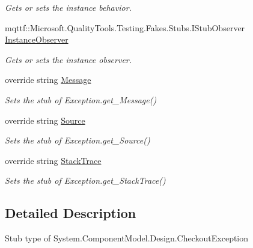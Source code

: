 \begin{DoxyCompactItemize}
\begin{DoxyCompactList}\small\item\em Gets or sets the instance behavior.\end{DoxyCompactList}\item 
mqttf\-::\-Microsoft.\-Quality\-Tools.\-Testing.\-Fakes.\-Stubs.\-I\-Stub\-Observer \hyperlink{class_system_1_1_component_model_1_1_design_1_1_fakes_1_1_stub_checkout_exception_a59dbec0d5ecebd2e2d3aca503fecbb8b}{Instance\-Observer}
\begin{DoxyCompactList}\small\item\em Gets or sets the instance observer.\end{DoxyCompactList}\item 
override string \hyperlink{class_system_1_1_component_model_1_1_design_1_1_fakes_1_1_stub_checkout_exception_a6f706b5e3a5874ca4ca5b7f06948d49c}{Message}
\begin{DoxyCompactList}\small\item\em Sets the stub of Exception.\-get\-\_\-\-Message()\end{DoxyCompactList}\item 
override string \hyperlink{class_system_1_1_component_model_1_1_design_1_1_fakes_1_1_stub_checkout_exception_a2a5a22faaf27912906365c56c00705d6}{Source}
\begin{DoxyCompactList}\small\item\em Sets the stub of Exception.\-get\-\_\-\-Source()\end{DoxyCompactList}\item 
override string \hyperlink{class_system_1_1_component_model_1_1_design_1_1_fakes_1_1_stub_checkout_exception_ae3e221c4f122e586cff5f80c393a526a}{Stack\-Trace}
\begin{DoxyCompactList}\small\item\em Sets the stub of Exception.\-get\-\_\-\-Stack\-Trace()\end{DoxyCompactList}\end{DoxyCompactItemize}


\subsection{Detailed Description}
Stub type of System.\-Component\-Model.\-Design.\-Checkout\-Exception




